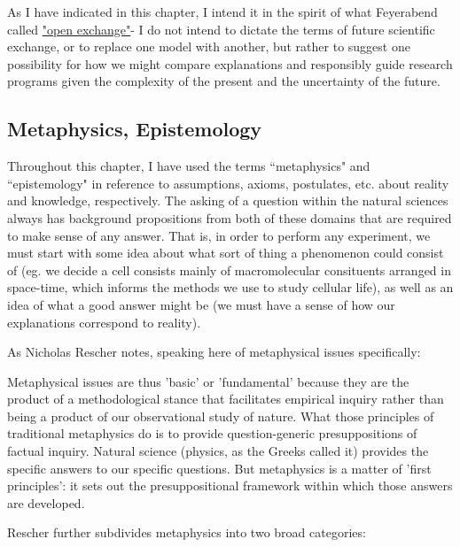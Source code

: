  As I have indicated in this chapter, I intend it in the spirit of what Feyerabend called \hyperref[open]{"open exchange"}-  I do not intend to dictate the terms of future scientific exchange, or to replace one model with another, but rather to suggest one possibility for how we might compare explanations and responsibly guide research programs given the complexity of the present and the uncertainty of the future.

\subsection{Metaphysics, Epistemology}
 Throughout this chapter, I have used the terms ``metaphysics" and ``epistemology" in reference to assumptions, axioms, postulates, etc. about reality and knowledge, respectively. The asking of a question within the natural sciences always has background propositions from both of these domains that are required to make sense of any answer. That is, in order to perform any experiment, we must start with some idea about what sort of thing a phenomenon could consist of (eg. we decide a cell consists mainly of macromolecular consituents arranged in space-time, which informs the methods we use to study cellular life), as well as an idea of what a good answer might be (we must have a sense of how our explanations correspond to reality).
 
 As Nicholas Rescher notes, speaking here of metaphysical issues specifically:
 
 \begin{longquote}
 Metaphysical issues are thus 'basic' or 'fundamental' because they are the product of a methodological stance that facilitates empirical inquiry rather than being a product of our observational study of nature. What those principles of traditional metaphysics do is to provide question-generic presuppositions of factual inquiry. Natural science (physics, as the Greeks called it) provides the specific answers to our specific questions. But metaphysics is a matter of 'first principles': it sets out the presuppositional framework within which those answers are developed.
 \cite[p.4]{Rescher2000}
 \end{longquote}
 
Rescher further subdivides metaphysics into two broad categories:

